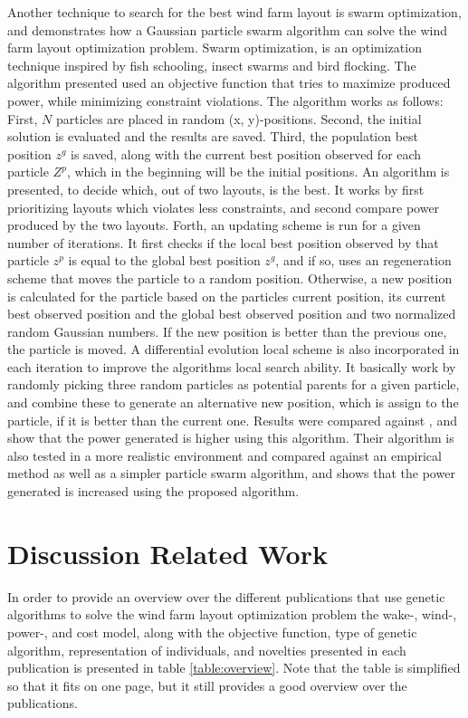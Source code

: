 \noindent Another technique to search for the best wind farm layout is swarm optimization, and \cite{Wan2012} demonstrates how a Gaussian particle swarm algorithm can solve the wind farm layout optimization problem. Swarm optimization, is an optimization technique inspired by fish schooling, insect swarms and bird flocking. The algorithm presented used an objective function that tries to maximize produced power, while minimizing constraint violations. The algorithm works as follows: First, $N$ particles are placed in random (x, y)-positions. Second, the initial solution is evaluated and the results are saved. Third, the population best position $z^g$ is saved, along with the current best position observed for each particle $Z^p$, which in the beginning will be the initial positions. An algorithm is presented, to decide which, out of two layouts, is the best. It works by first prioritizing layouts which violates less constraints, and second compare power produced by the two layouts. Forth, an updating scheme is run for a given number of iterations. It first checks if the local best position observed by that particle $z^p$ is equal to the global best position $z^g$, and if so, uses an regeneration scheme that moves the particle to a random position. Otherwise, a new position is calculated for the particle based on the particles current position, its current best observed position and the global best observed position and two normalized random Gaussian numbers. If the new position is better than the previous one, the particle is moved. A differential evolution local scheme is also incorporated in each iteration to improve the algorithms local search ability. It basically work by randomly picking three random particles as potential parents for a given particle, and combine these to generate an alternative new position, which is assign to the particle, if it is better than the current one. Results were compared against \citep{Grady}, and show that the power generated is higher using this algorithm. Their algorithm is also tested in a more realistic environment and compared against an empirical method as well as a simpler particle swarm algorithm, and shows that the power generated is increased using the proposed algorithm.\\


\section{Discussion Related Work}\label{section:relatedworkdiscussion}
In order to provide an overview over the different publications that use genetic algorithms to solve the wind farm layout optimization problem the wake-, wind-, power-, and cost model, along with the objective function, type of genetic algorithm, representation of individuals, and novelties presented in each publication is presented in table \ref{table:overview}. Note that the table is simplified so that it fits on one page, but it still provides a good overview over the publications. \\

